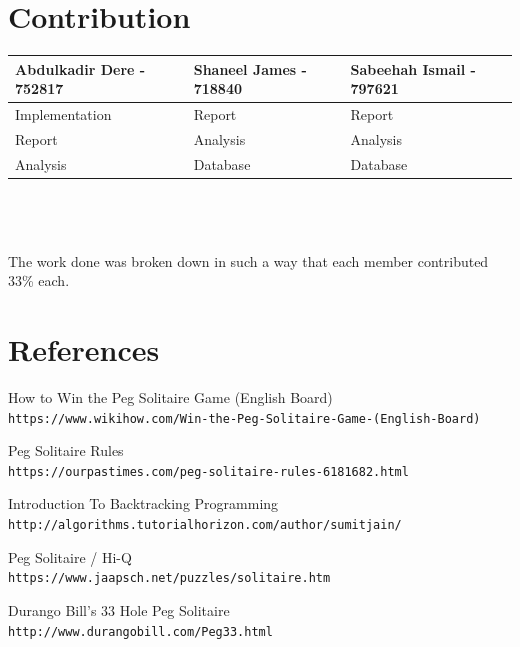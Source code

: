 \documentclass{article}
\begin{document}
\newpage
\section{Contribution}
\begin{tabular}{|l|l|l|}
\hline
Abdulkadir Dere - 752817 & Shaneel James - 718840 & Sabeehah Ismail - 797621 \\
\hline
Implementation&Report &Report \\
Report&Analysis &Analysis \\
Analysis&Database &Database \\
\hline
\end{tabular}\\\\
\\The work done was broken down in such a way that each member contributed 33\% each.

\section{References}
\begin{thebibliography}{9}

How to Win the Peg Solitaire Game (English Board)
\\\texttt{https://www.wikihow.com/Win-the-Peg-Solitaire-Game-(English-Board)}

Peg Solitaire Rules
\\\texttt{https://ourpastimes.com/peg-solitaire-rules-6181682.html}

Introduction To Backtracking Programming
\\\texttt{http://algorithms.tutorialhorizon.com/author/sumitjain/}

Peg Solitaire / Hi-Q
\\\texttt{https://www.jaapsch.net/puzzles/solitaire.htm}

Durango Bill's 33 Hole Peg Solitaire
\\\texttt{http://www.durangobill.com/Peg33.html}


\end{thebibliography}
\end{document}
